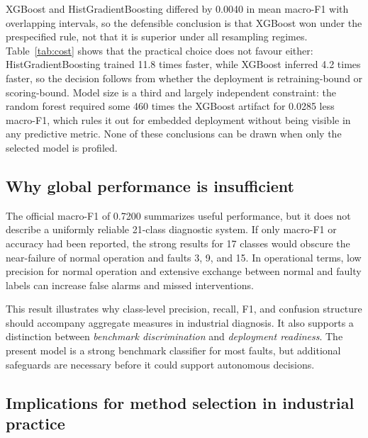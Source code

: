 \documentclass[10pt,twocolumn,a4paper]{article}
\begin{document}
XGBoost and HistGradientBoosting differed by 0.0040 in mean macro-F1 with
overlapping intervals, so the defensible conclusion is that XGBoost won under
the prespecified rule, not that it is superior under all resampling regimes.
Table~\ref{tab:cost} shows that the practical choice does not favour either:
HistGradientBoosting trained 11.8 times faster, while XGBoost inferred 4.2
times faster, so the decision follows from whether the deployment is
retraining-bound or scoring-bound. Model size is a third and largely
independent constraint: the random forest required some 460 times the XGBoost
artifact for 0.0285 less macro-F1, which rules it out for embedded deployment
without being visible in any predictive metric. None of these conclusions can
be drawn when only the selected model is profiled.

\subsection{Why global performance is insufficient}

The official macro-F1 of 0.7200 summarizes useful performance, but it does not
describe a uniformly reliable 21-class diagnostic system. If only macro-F1 or
accuracy had been reported, the strong results for 17 classes would obscure
the near-failure of normal operation and faults 3, 9, and 15. In operational
terms, low precision for normal operation and extensive exchange between normal
and faulty labels can increase false alarms and missed interventions.

This result illustrates why class-level precision, recall, F1, and confusion
structure should accompany aggregate measures in industrial diagnosis. It also
supports a distinction between \emph{benchmark discrimination} and
\emph{deployment readiness}. The present model is a strong benchmark
classifier for most faults, but additional safeguards are necessary before it
could support autonomous decisions.

\subsection{Implications for method selection in industrial practice}
\label{sec:practice}
\end{document}
